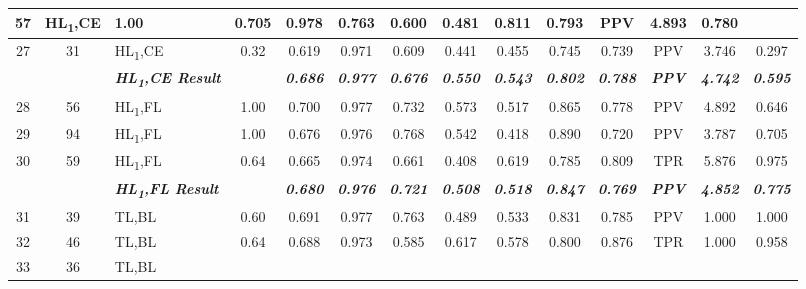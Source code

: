 \begin{table}[H]
{\begin{tabular}{cc|l|c|c|c|c|c|c|c|c|c|c|c|}
    57 &
    HL\textsubscript{1},CE &
    1.00 &
    0.705 &
    0.978 &
    0.763 &
    0.600 &
    0.481 &
    0.811 &
    0.793 &
    PPV &
    4.893 &
    0.780 \\ \hline
  \multicolumn{1}{|c|}{27} &
    31 &
    HL\textsubscript{1},CE &
    0.32 &
    0.619 &
    0.971 &
    0.609 &
    0.441 &
    0.455 &
    0.745 &
    0.739 &
    PPV &
    3.746 &
    0.297 \\ \hline
   &
    \textit{\textbf{}} &
    \textit{\textbf{HL\textsubscript{1},CE Result}} &
    \textit{\textbf{}} &
    \textit{\textbf{0.686}} &
    \textit{\textbf{0.977}} &
    \textit{\textbf{0.676}} &
    \textit{\textbf{0.550}} &
    \textit{\textbf{0.543}} &
    \textit{\textbf{0.802}} &
    \textit{\textbf{0.788}} &
    \textit{\textbf{PPV}} &
    \textit{\textbf{4.742}} &
    \textit{\textbf{0.595}} \\ \hline
  \multicolumn{1}{|c|}{28} &
    56 &
    HL\textsubscript{1},FL &
    1.00 &
    0.700 &
    0.977 &
    0.732 &
    0.573 &
    0.517 &
    0.865 &
    0.778 &
    PPV &
    4.892 &
    0.646 \\ \hline
  \multicolumn{1}{|c|}{29} &
    94 &
    HL\textsubscript{1},FL &
    1.00 &
    0.676 &
    0.976 &
    0.768 &
    0.542 &
    0.418 &
    0.890 &
    0.720 &
    PPV &
    3.787 &
    0.705 \\ \hline
  \multicolumn{1}{|c|}{30} &
    59 &
    HL\textsubscript{1},FL &
    0.64 &
    0.665 &
    0.974 &
    0.661 &
    0.408 &
    0.619 &
    0.785 &
    0.809 &
    TPR &
    5.876 &
    0.975 \\ \hline
   &
    \textit{\textbf{}} &
    \textit{\textbf{HL\textsubscript{1},FL Result}} &
    \textit{\textbf{}} &
    \textit{\textbf{0.680}} &
    \textit{\textbf{0.976}} &
    \textit{\textbf{0.721}} &
    \textit{\textbf{0.508}} &
    \textit{\textbf{0.518}} &
    \textit{\textbf{0.847}} &
    \textit{\textbf{0.769}} &
    \textit{\textbf{PPV}} &
    \textit{\textbf{4.852}} &
    \textit{\textbf{0.775}} \\ \hline
  \multicolumn{1}{|c|}{31} &
    39 &
    TL,BL &
    0.60 &
    0.691 &
    0.977 &
    0.763 &
    0.489 &
    0.533 &
    0.831 &
    0.785 &
    PPV &
    1.000 &
    1.000 \\ \hline
  \multicolumn{1}{|c|}{32} &
    46 &
    TL,BL &
    0.64 &
    0.688 &
    0.973 &
    0.585 &
    0.617 &
    0.578 &
    0.800 &
    0.876 &
    TPR &
    1.000 &
    0.958 \\ \hline
  \multicolumn{1}{|c|}{33} &
    36 &
    TL,BL &

\end{tabular}}
\end{table}
